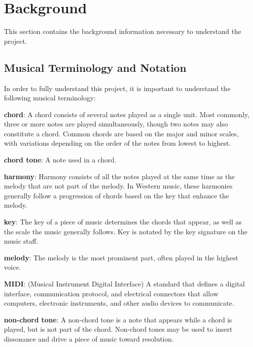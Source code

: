 \chapter{Background} \label{bg}

This section contains the background information necessary to understand the project. %




\section{Musical Terminology and Notation} \label{bg:musicTerminology}

In order to fully understand this project, it is important to understand the following musical terminology:

\textbf{chord}: A chord consists of several notes played as a single unit.
Most commonly, three or more notes are played simultaneously, though two notes may also constitute a chord.
Common chords are based on the major and minor scales, with variations depending on the order of the notes from lowest to highest.

\textbf{chord tone}: A note used in a chord.

\textbf{harmony}: Harmony consists of all the notes played at the same time as the melody that are not part of the melody.
In Western music, these harmonies generally follow a progression of chords based on the key that enhance the melody.

\textbf{key}: The key of a piece of music determines the chords that appear, as well as the scale the music generally follows.
Key is notated by the key signature on the music staff.

\textbf{melody}: The melody is the most prominent part, often played in the highest voice.

\textbf{MIDI}: (Musical Instrument Digital Interface) A standard that defines a digital interface, communication protocol, and electrical connectors that allow computers, electronic instruments, and other audio devices to communicate.

\textbf{non-chord tone}: A non-chord tone is a note that appears while a chord is played, but is not part of the chord.
Non-chord tones may be used to insert dissonance and drive a piece of music toward resolution.

